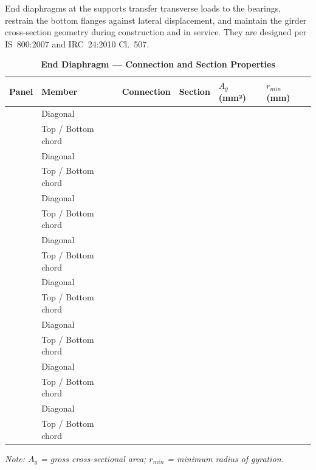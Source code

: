 \documentclass[12pt,a4paper]{report}
\numberwithin{table}{chapter}
\numberwithin{figure}{chapter}
\begin{document}
End diaphragms at the supports transfer transverse loads to the bearings, restrain the bottom flanges against lateral displacement, and maintain the girder cross-section geometry during construction and in service. They are designed per IS~800:2007 and IRC~24:2010 Cl.~507.

\vspace{1em}

\vspace{0.4em}
\noindent
\setlength{\tabcolsep}{4pt}
\setlength{\LTleft}{0pt}
\setlength{\LTright}{\fill}

\begin{longtable}{|C{2.0cm}|L{2.0cm}|L{2.2cm}|C{2.5cm}|C{2.0cm}|C{2.0cm}|}
\caption{\textbf{End Diaphragm --- Connection and Section Properties}}
\hline
\textbf{Panel} & \textbf{Member} & \textbf{Connection} & \textbf{Section} & \textbf{$A_g$ (mm²)} & \textbf{$r_{min}$ (mm)} \\[6pt]
\hline
{} & Diagonal &  &  &  &  \\[6pt]
 & Top / Bottom chord &  &  &  &  \\[6pt]
\hline
{} & Diagonal &  &  &  &  \\[6pt]
 & Top / Bottom chord &  &  &  &  \\[6pt]
\hline
{} & Diagonal &  &  &  &  \\[6pt]
 & Top / Bottom chord &  &  &  &  \\[6pt]
\hline
{} & Diagonal &  &  &  &  \\[6pt]
 & Top / Bottom chord &  &  &  &  \\[6pt]
\hline
{} & Diagonal &  &  &  &  \\[6pt]
 & Top / Bottom chord &  &  &  &  \\[6pt]
\hline
{} & Diagonal &  &  &  &  \\[6pt]
 & Top / Bottom chord &  &  &  &  \\[6pt]
\hline
{} & Diagonal &  &  &  &  \\[6pt]
 & Top / Bottom chord &  &  &  &  \\[6pt]
\hline
{} & Diagonal &  &  &  &  \\[6pt]
 & Top / Bottom chord &  &  &  &  \\[6pt]
\hline
\end{longtable}
\noindent\textit{Note: $A_g$ = gross cross-sectional area; $r_{min}$ = minimum radius of gyration.}
\end{document}
